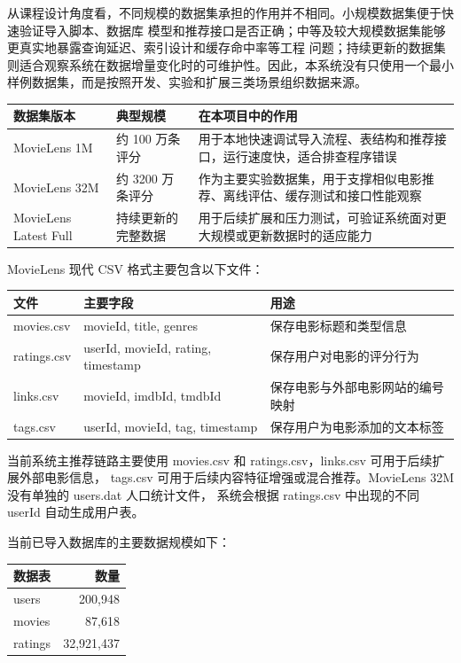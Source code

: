 从课程设计角度看，不同规模的数据集承担的作用并不相同。小规模数据集便于快速验证导入脚本、数据库
模型和推荐接口是否正确；中等及较大规模数据集能够更真实地暴露查询延迟、索引设计和缓存命中率等工程
问题；持续更新的数据集则适合观察系统在数据增量变化时的可维护性。因此，本系统没有只使用一个最小
样例数据集，而是按照开发、实验和扩展三类场景组织数据来源。

\begin{center}
\begin{tabular}{p{4.0cm}p{3.4cm}p{5.2cm}}
\toprule
\textbf{数据集版本} & \textbf{典型规模} & \textbf{在本项目中的作用} \\
\midrule
MovieLens 1M & 约 100 万条评分 & 用于本地快速调试导入流程、表结构和推荐接口，运行速度快，适合排查程序错误 \\
MovieLens 32M & 约 3200 万条评分 & 作为主要实验数据集，用于支撑相似电影推荐、离线评估、缓存测试和接口性能观察 \\
MovieLens Latest Full & 持续更新的完整数据 & 用于后续扩展和压力测试，可验证系统面对更大规模或更新数据时的适应能力 \\
\bottomrule
\end{tabular}
\end{center}

MovieLens 现代 CSV 格式主要包含以下文件：

\begin{center}
\begin{tabular}{lll}
\toprule
\textbf{文件} & \textbf{主要字段} & \textbf{用途} \\
\midrule
movies.csv  & movieId, title, genres & 保存电影标题和类型信息 \\
ratings.csv & userId, movieId, rating, timestamp & 保存用户对电影的评分行为 \\
links.csv   & movieId, imdbId, tmdbId & 保存电影与外部电影网站的编号映射 \\
tags.csv    & userId, movieId, tag, timestamp & 保存用户为电影添加的文本标签 \\
\bottomrule
\end{tabular}
\end{center}

当前系统主推荐链路主要使用 movies.csv 和 ratings.csv，links.csv 可用于后续扩展外部电影信息，
tags.csv 可用于后续内容特征增强或混合推荐。MovieLens 32M 没有单独的 users.dat 人口统计文件，
系统会根据 ratings.csv 中出现的不同 userId 自动生成用户表。

\begin{samepage}
当前已导入数据库的主要数据规模如下：

\begin{center}
\begin{tabular}{lr}
\toprule
\textbf{数据表} & \textbf{数量} \\
\midrule
users   & 200{,}948 \\
movies  & 87{,}618 \\
ratings & 32{,}921{,}437 \\
\bottomrule
\end{tabular}
\end{center}
\end{samepage}

